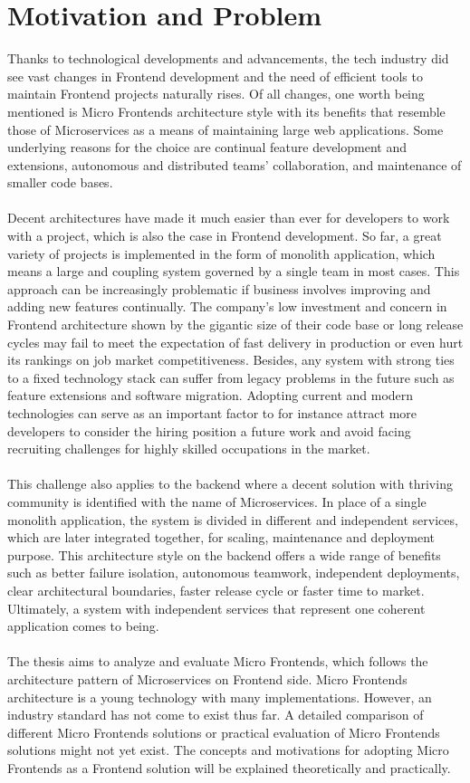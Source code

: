 \documentclass[a4paper]{book}
\begin{document}
 \section{Motivation and Problem}
Thanks to technological developments and advancements, the tech industry did see vast changes in Frontend development and the need of efficient tools to maintain Frontend projects naturally rises. Of all changes, one worth being mentioned is Micro Frontends architecture style with its benefits that resemble those of Microservices as a means of maintaining large web applications. Some underlying reasons for the choice are continual feature development and extensions, autonomous and distributed teams’ collaboration, and maintenance of smaller code bases. 
\\
\\
Decent architectures have made it much easier than ever for developers to work with a project, which is also the case in Frontend development. So far, a great variety of projects is implemented in the form of monolith application, which means a large and coupling system governed by a single team in most cases. This approach can be increasingly problematic if business involves improving and adding new features continually. The company’s low investment and concern in Frontend architecture shown by the gigantic size of their code base or long release cycles may fail to meet the expectation of fast delivery in production or even hurt its rankings on job market competitiveness. Besides, any system with strong ties to a fixed technology stack can suffer from legacy problems in the future such as feature extensions and software migration. Adopting current and modern technologies can serve as an important factor to for instance attract more developers to consider the hiring position a future work and avoid facing recruiting challenges for highly skilled occupations in the market.
\\
\\
This challenge also applies to the backend where a decent solution with thriving community is identified with the name of Microservices. In place of a single monolith application, the system is divided in different and independent services, which are later integrated together, for scaling, maintenance and deployment purpose. This architecture style on the backend offers a wide range of benefits such as better failure isolation, autonomous teamwork, independent deployments, clear architectural boundaries, faster release cycle or faster time to market. Ultimately, a system with independent services that represent one coherent application comes to being.
\\
\\
The thesis aims to analyze and evaluate Micro Frontends, which follows the architecture pattern of Microservices on Frontend side. Micro Frontends architecture is a young technology with many implementations. However, an industry standard has not come to exist thus far. A detailed comparison of different Micro Frontends solutions or practical evaluation of Micro Frontends solutions might not yet exist. The concepts and motivations for adopting Micro Frontends as a Frontend solution will be explained theoretically and practically. 
\end{document}
